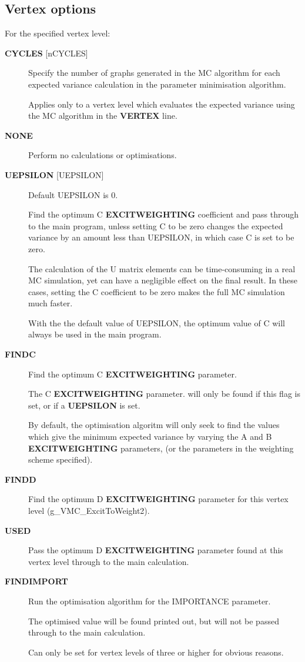\documentclass[openany,a4paper,10pt,english]{manual}
\begin{document}
\subsection{Vertex options}

For the specified vertex level:
\begin{description}
\item[\textbf{CYCLES} {[}nCYCLES{]}] \leavevmode
Specify the number of graphs generated in the MC algorithm
for each expected variance calculation in the parameter minimisation algorithm.

Applies only to a vertex level which evaluates the expected variance
using the MC algorithm in the \textbf{VERTEX} line.

\item[\textbf{NONE}] \leavevmode
Perform no calculations or optimisations.

\item[\textbf{UEPSILON} {[}UEPSILON{]}] \leavevmode
Default UEPSILON is 0.

Find the  optimum C \textbf{EXCITWEIGHTING} coefficient and pass through to the main program,
unless setting C to be zero changes the expected variance by an amount less
than UEPSILON, in which case C is set to be zero.

The calculation of the U matrix elements can be time-consuming
in a real MC simulation, yet can have a negligible effect on the
final result.  In these cases, setting the C coefficient to be zero
makes the full MC simulation much faster.

With the the default value of UEPSILON, the optimum value of C will
always be used in the main program.

\item[\textbf{FINDC}] \leavevmode
Find the optimum C \textbf{EXCITWEIGHTING} parameter.

The C \textbf{EXCITWEIGHTING} parameter. will only be found if this
flag is set, or if a \textbf{UEPSILON} is set.

By default, the optimisation algoritm will only seek to find the
values which give the minimum expected variance by varying the A and
B \textbf{EXCITWEIGHTING} parameters, (or the parameters in the weighting
scheme specified).

\item[\textbf{FINDD}] \leavevmode
Find the optimum D \textbf{EXCITWEIGHTING} parameter for this vertex
level (g\_VMC\_ExcitToWeight2).

\item[\textbf{USED}] \leavevmode
Pass the optimum D \textbf{EXCITWEIGHTING} parameter found at this vertex level
through to the main calculation.

\item[\textbf{FINDIMPORT}] \leavevmode
Run the optimisation algorithm for the IMPORTANCE
parameter.

The optimised value will be found printed out,
but will not be passed through to the main calculation.

Can only be set for vertex levels of three or higher for
obvious reasons.

\end{description}
\end{document}

